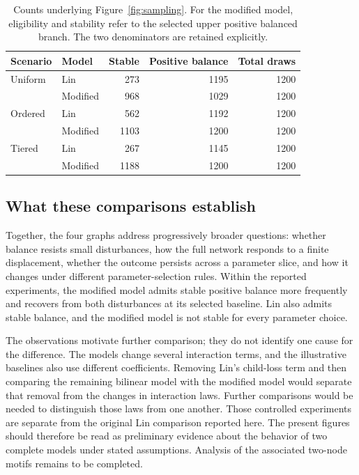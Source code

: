 \begin{table}[H]
\centering
\small
\begin{tabular}{llrrr}
\toprule
Scenario & Model & Stable & Positive balance & Total draws\\
\midrule
Uniform & Lin      & 273  & 1195 & 1200\\
        & Modified & 968  & 1029 & 1200\\
Ordered & Lin      & 562  & 1192 & 1200\\
        & Modified & 1103 & 1200 & 1200\\
Tiered  & Lin      & 267  & 1145 & 1200\\
        & Modified & 1188 & 1200 & 1200\\
\bottomrule
\end{tabular}
\caption{Counts underlying Figure~\ref{fig:sampling}. For the modified
model, eligibility and stability refer to the selected upper positive
balanced branch. The two denominators are retained explicitly.}
\label{tab:sampling}
\end{table}

\subsection{What these comparisons establish}
Together, the four graphs address progressively broader questions: whether
balance resists small disturbances, how the full network responds to a
finite displacement, whether the outcome persists across a parameter slice,
and how it changes under different parameter-selection rules. Within the
reported experiments, the modified model admits stable positive balance
more frequently and recovers from both disturbances at its selected
baseline. Lin also admits stable balance, and the modified model is not
stable for every parameter choice.

The observations motivate further comparison; they do not identify one
cause for the difference. The models change several interaction terms,
and the illustrative baselines also use different coefficients. Removing
Lin's child-loss term and then comparing the remaining bilinear model
with the modified model would separate that removal from the changes in
interaction laws. Further comparisons would be needed to distinguish those
laws from one another. Those controlled experiments are separate from the
original Lin comparison reported here. The present figures should therefore
be read as preliminary evidence about the behavior of two complete models
under stated assumptions. Analysis of the associated two-node motifs
remains to be completed.
\FloatBarrier

